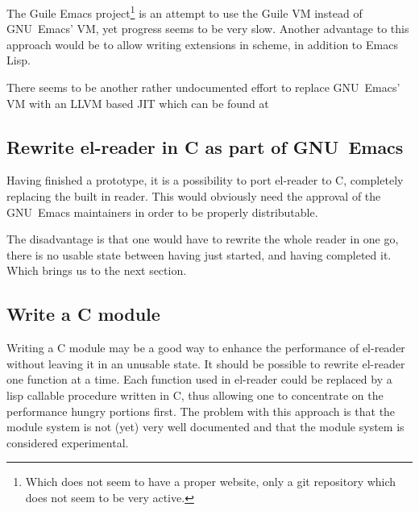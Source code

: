 \documentclass[a4paper,10pt,twoside]{report}
\newcommand{\el}{Emacs Lisp}
\newcommand{\cl}{Common Lisp}
\newcommand{\elr}{el-reader}
\newcommand{\fun}[1]{\texttt{#1}}
\newcommand{\emacs}{GNU~Emacs}
\begin{document}
The Guile Emacs project\cite{guile-emacs}\footnote{Which does not seem to have a
  proper website, only a git repository which does not seem to be very active.}
is an attempt to use the Guile\cite{guile} VM instead of \emacs{}’ VM, yet
progress seems to be very slow.  Another advantage to this approach would be to
allow writing extensions in scheme, in addition to \el{}.

There seems to be another rather undocumented effort to replace \emacs{}’ VM
with an LLVM\cite{llvm} based JIT which can be found at \cite{emacs-llvm}

\subsection{Rewrite \elr{} in C as part of \emacs{}}
\label{subsec:rewrite-in-C}

Having finished a prototype, it is a possibility to port \elr{} to C, completely
replacing the built in reader.  This would obviously need the approval of the
\emacs{} maintainers in order to be properly distributable.

The disadvantage is that one would have to rewrite the whole reader in one go,
there is no usable state between having just started, and having completed it.
Which brings us to the next section.

\subsection{Write a C module}
\label{subsec:C-module}

Writing a C module may be a good way to enhance the performance of \elr{}
without leaving it in an unusable state.  It should be possible to rewrite
\elr{} one function at a time.  Each function used in \elr{} could be replaced
by a lisp callable procedure written in C, thus allowing one to concentrate on
the performance hungry portions first.  The problem with this approach is that
the module system is not (yet) very well documented and that the module system
is considered experimental.





\vfill
\pagebreak


\end{document}
